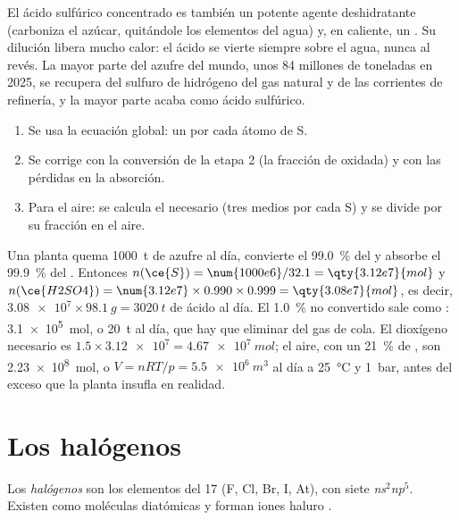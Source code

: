 El ácido sulfúrico concentrado es también un potente agente deshidratante
(carboniza el azúcar, quitándole los elementos del agua) y, en caliente,
un . Su dilución libera mucho calor: el ácido se vierte siempre
sobre el agua, nunca al revés. La mayor parte del azufre del mundo, unos
84 millones de toneladas en 2025, se recupera del sulfuro de hidrógeno
del gas natural y de las corrientes de refinería, y la mayor parte acaba
como ácido sulfúrico.

\begin{method}\label{met:b1:p-block-16-18:contact-balance}
\begin{enumerate}
  \item Se usa la ecuación global: un  por cada átomo de S.
  \item Se corrige con la conversión de la etapa 2 (la fracción de
         oxidada) y con las pérdidas en la absorción.
  \item Para el aire: se calcula el  necesario (tres medios por
        cada S) y se divide por su fracción en el aire.
\end{enumerate}
\end{method}

\begin{example}
Una planta quema \qty{1000}{t} de azufre al día, convierte el
\qty{99.0}{\percent} del  y absorbe el \qty{99.9}{\percent} del
. Entonces $n(\ce{S}) = \num{1000e6}/32.1 = \qty{3.12e7}{mol}$ y
$n(\ce{H2SO4}) = \num{3.12e7} \times 0.990 \times 0.999
= \qty{3.08e7}{mol}$, es decir, $\num{3.08e7} \times \qty{98.1}{g}
= \qty{3020}{t}$ de ácido al día. El \qty{1.0}{\percent} no convertido
sale como : \qty{3.1e5}{mol}, o \qty{20}{t} al día, que hay que
eliminar del gas de cola. El dioxígeno necesario es
$1.5 \times \num{3.12e7} =
\qty{4.67e7}{mol}$; el aire, con un
\qty{21}{\percent} de , son \qty{2.23e8}{mol}, o
$V = nRT/p = \qty{5.5e6}{m^3}$ al día a \qty{25}{\celsius} y
\qty{1}{bar}, antes del exceso que la planta insufla en realidad.
\end{example}

\section{Los halógenos}

\begin{definition}[Halógenos]\label{def:b1:p-block-16-18:halogen}
Los \emph{halógenos} son los elementos del  17 (F, Cl,
Br, I, At), con siete 
\textit{ns}$^2$\textit{np}$^5$. Existen como moléculas diatómicas 
y forman iones haluro .
\end{definition}

